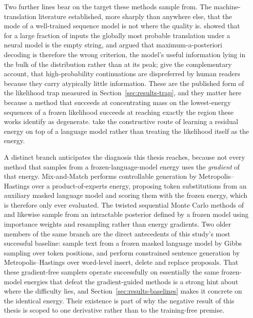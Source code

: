 Two further lines bear on the target these methods sample from. The machine-translation literature established, more sharply than anywhere else, that the mode of a well-trained sequence model is not where the quality is. \citet{stahlberg2019nmt} showed that for a large fraction of inputs the globally most probable translation under a neural model is the empty string, and \citet{eikema2020map} argued that maximum-a-posteriori decoding is therefore the wrong criterion, the model's useful information lying in the bulk of the distribution rather than at its peak; \citet{meister2023locally} give the complementary account, that high-probability continuations are dispreferred by human readers because they carry atypically little information. These are the published form of the likelihood trap measured in Section~\ref{sec:results-trap}, and they matter here because a method that succeeds at concentrating mass on the lowest-energy sequences of a frozen likelihood succeeds at reaching exactly the region these works identify as degenerate. \citet{deng2020residual} take the constructive route of learning a residual energy on top of a language model rather than treating the likelihood itself as the energy.

A distinct branch anticipates the diagnosis this thesis reaches, because not every method that samples from a frozen-language-model energy uses the \emph{gradient} of that energy. Mix-and-Match \citep{mireshghallah2022mixmatch} performs controllable generation by Metropolis--Hastings over a product-of-experts energy, proposing token substitutions from an auxiliary masked language model and scoring them with the frozen energy, which is therefore only ever evaluated. The twisted sequential Monte Carlo methods of \citet{lew2023sequential} and \citet{zhao2024probabilistic} likewise sample from an intractable posterior defined by a frozen model using importance weights and resampling rather than energy gradients. Two older members of the same branch are the direct antecedents of this study's most successful baseline: \citet{wang2019bert} sample text from a frozen masked language model by Gibbs sampling over token positions, and \citet{miao2019cgmh} perform constrained sentence generation by Metropolis--Hastings over word-level insert, delete and replace proposals. That these gradient-free samplers operate successfully on essentially the same frozen-model energies that defeat the gradient-guided methods is a strong hint about where the difficulty lies, and Section~\ref{sec:results-baselines} makes it concrete on the identical energy. Their existence is part of why the negative result of this thesis is scoped to one derivative rather than to the training-free premise.

